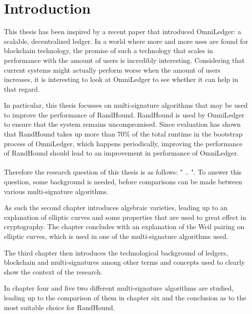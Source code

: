 \documentclass[12pt]{report}
\begin{document}
	\chapter{Introduction}
	This thesis has been inspired by a recent paper that introduced OmniLedger\cite{omniledger}: a scalable, decentralized ledger. In a world where more and more uses are found for blockchain technology, the promise of such a technology that scales in performance with the amount of users is incredibly interesting. Considering that current systems might actually perform worse when the amount of users increases, it is interesting to look at OmniLedger to see whether it can help in that regard.
	
	In particular, this thesis focusses on multi-signature algorithms that may be used to improve the performance of RandHound\cite{randhound}. RandHound is used by OmniLedger to ensure that the system remains uncompromised. Since evaluation has shown that RandHound takes up more than 70\% of the total runtime in the bootstrap process of OmniLedger, which happens periodically, improving the performance of RandHound should lead to an improvement in performance of OmniLedger.
	\\
	\\
	Therefore the research question of this thesis is as follows: " .. ". To answer this question, some background is needed, before comparisons can be made between various multi-signature algorithms.
	
	As such the second chapter introduces algebraic varieties, leading up to an explanation of elliptic curves and some properties that are used to great effect in cryptography. The chapter concludes with an explanation of the Weil pairing on elliptic curves, which is used in one of the multi-signature algorithms used.
	
	The third chapter then introduces the technological background of ledgers, blockchain and multi-signatures among other terms and concepts used to clearly show the context of the research.
	
	In chapter four and five two different multi-signature algorithms are studied, leading up to the comparison of them in chapter six and the conclusion as to the most suitable choice for RandHound.
\end{document}
